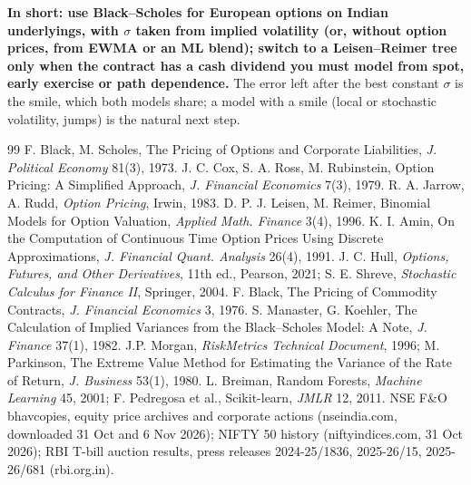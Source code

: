 \documentclass[10pt,a4paper]{article}
\begin{document}
\textbf{In short: use Black--Scholes for European options on Indian underlyings, with $\sigma$ taken from implied
volatility (or, without option prices, from EWMA or an ML blend); switch to a Leisen--Reimer tree only when the
contract has a cash dividend you must model from spot, early exercise or path dependence.} The error left after the
best constant $\sigma$ is the smile, which both models share; a model with a smile (local or stochastic volatility,
jumps) is the natural next step.

\vspace{-4pt}
{\small
\begin{thebibliography}{99}\setlength{\itemsep}{0pt}
 F. Black, M. Scholes, The Pricing of Options and Corporate Liabilities, \emph{J. Political Economy} 81(3), 1973.
 J. C. Cox, S. A. Ross, M. Rubinstein, Option Pricing: A Simplified Approach, \emph{J. Financial Economics} 7(3), 1979.
 R. A. Jarrow, A. Rudd, \emph{Option Pricing}, Irwin, 1983.
 D. P. J. Leisen, M. Reimer, Binomial Models for Option Valuation, \emph{Applied Math. Finance} 3(4), 1996.
 K. I. Amin, On the Computation of Continuous Time Option Prices Using Discrete Approximations, \emph{J. Financial Quant. Analysis} 26(4), 1991.
 J. C. Hull, \emph{Options, Futures, and Other Derivatives}, 11th ed., Pearson, 2021; S. E. Shreve, \emph{Stochastic Calculus for Finance II}, Springer, 2004.
 F. Black, The Pricing of Commodity Contracts, \emph{J. Financial Economics} 3, 1976.
 S. Manaster, G. Koehler, The Calculation of Implied Variances from the Black--Scholes Model: A Note, \emph{J. Finance} 37(1), 1982.
 J.P. Morgan, \emph{RiskMetrics Technical Document}, 1996; M. Parkinson, The Extreme Value Method for Estimating the Variance of the Rate of Return, \emph{J. Business} 53(1), 1980.
 L. Breiman, Random Forests, \emph{Machine Learning} 45, 2001; F. Pedregosa et al., Scikit-learn, \emph{JMLR} 12, 2011.
 NSE F\&O bhavcopies, equity price archives and corporate actions (nseindia.com, downloaded 31 Oct and 6 Nov 2026);
NIFTY 50 history (niftyindices.com, 31 Oct 2026); RBI T-bill auction results, press releases 2024-25/1836, 2025-26/15, 2025-26/681 (rbi.org.in).
\end{thebibliography}}
\end{document}
